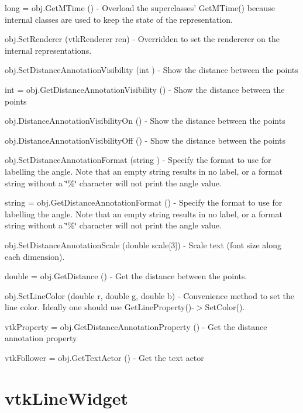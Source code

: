 \begin{DoxyItemize}
\item {\ttfamily long = obj.\-Get\-M\-Time ()} -\/ Overload the superclasses' Get\-M\-Time() because internal classes are used to keep the state of the representation.  
\item {\ttfamily obj.\-Set\-Renderer (vtk\-Renderer ren)} -\/ Overridden to set the rendererer on the internal representations.  
\item {\ttfamily obj.\-Set\-Distance\-Annotation\-Visibility (int )} -\/ Show the distance between the points  
\item {\ttfamily int = obj.\-Get\-Distance\-Annotation\-Visibility ()} -\/ Show the distance between the points  
\item {\ttfamily obj.\-Distance\-Annotation\-Visibility\-On ()} -\/ Show the distance between the points  
\item {\ttfamily obj.\-Distance\-Annotation\-Visibility\-Off ()} -\/ Show the distance between the points  
\item {\ttfamily obj.\-Set\-Distance\-Annotation\-Format (string )} -\/ Specify the format to use for labelling the angle. Note that an empty string results in no label, or a format string without a \char`\"{}\%\char`\"{} character will not print the angle value.  
\item {\ttfamily string = obj.\-Get\-Distance\-Annotation\-Format ()} -\/ Specify the format to use for labelling the angle. Note that an empty string results in no label, or a format string without a \char`\"{}\%\char`\"{} character will not print the angle value.  
\item {\ttfamily obj.\-Set\-Distance\-Annotation\-Scale (double scale\mbox{[}3\mbox{]})} -\/ Scale text (font size along each dimension).  
\item {\ttfamily double = obj.\-Get\-Distance ()} -\/ Get the distance between the points.  
\item {\ttfamily obj.\-Set\-Line\-Color (double r, double g, double b)} -\/ Convenience method to set the line color. Ideally one should use Get\-Line\-Property()-\/$>$Set\-Color().  
\item {\ttfamily vtk\-Property = obj.\-Get\-Distance\-Annotation\-Property ()} -\/ Get the distance annotation property  
\item {\ttfamily vtk\-Follower = obj.\-Get\-Text\-Actor ()} -\/ Get the text actor  
\end{DoxyItemize}\hypertarget{vtkwidgets_vtklinewidget}{}\section{vtk\-Line\-Widget}\label{vtkwidgets_vtklinewidget}
